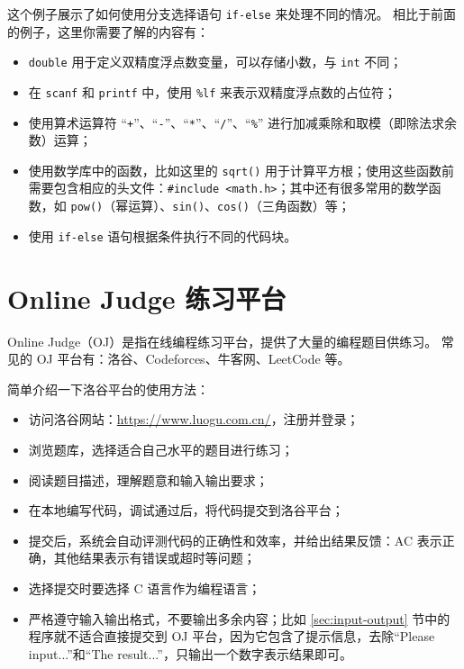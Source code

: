 \documentclass[lang=cn,newtx,10pt,scheme=chinese]{elegantbook}
\begin{document}
这个例子展示了如何使用分支选择语句 \lstinline{if-else} 来处理不同的情况。
相比于前面的例子，这里你需要了解的内容有：

\begin{itemize}
    \item \lstinline{double} 用于定义双精度浮点数变量，可以存储小数，与 \lstinline{int} 不同；
    \item 在 \lstinline{scanf} 和 \lstinline{printf} 中，使用 \lstinline{%lf} 来表示双精度浮点数的占位符；
    \item 使用算术运算符 “\lstinline{+}”、“\lstinline{-}”、“\lstinline{*}”、“\lstinline{/}”、“\lstinline{%}” 进行加减乘除和取模（即除法求余数）运算；
    \item 使用数学库中的函数，比如这里的 \lstinline{sqrt()} 用于计算平方根；使用这些函数前需要包含相应的头文件：\lstinline{#include <math.h>}；其中还有很多常用的数学函数，如 \lstinline{pow()}（幂运算）、\lstinline{sin()}、\lstinline{cos()}（三角函数）等；
    \item 使用 \lstinline{if-else} 语句根据条件执行不同的代码块。
\end{itemize}

\section{Online Judge 练习平台}

Online Judge（OJ）是指在线编程练习平台，提供了大量的编程题目供练习。
常见的 OJ 平台有：洛谷、Codeforces、牛客网、LeetCode 等。

简单介绍一下洛谷平台的使用方法：

\begin{itemize}
    \item 访问洛谷网站：\href{https://www.luogu.com.cn/}{https://www.luogu.com.cn/}，注册并登录；
    \item 浏览题库，选择适合自己水平的题目进行练习；
    \item 阅读题目描述，理解题意和输入输出要求；
    \item 在本地编写代码，调试通过后，将代码提交到洛谷平台；
    \item 提交后，系统会自动评测代码的正确性和效率，并给出结果反馈：AC 表示正确，其他结果表示有错误或超时等问题；
    \item 选择提交时要选择 C 语言作为编程语言；
    \item 严格遵守输入输出格式，不要输出多余内容；比如 \ref{sec:input-output} 节中的程序就不适合直接提交到 OJ 平台，因为它包含了提示信息，去除“Please input...”和“The result...”，只输出一个数字表示结果即可。
\end{itemize}
\end{document}
